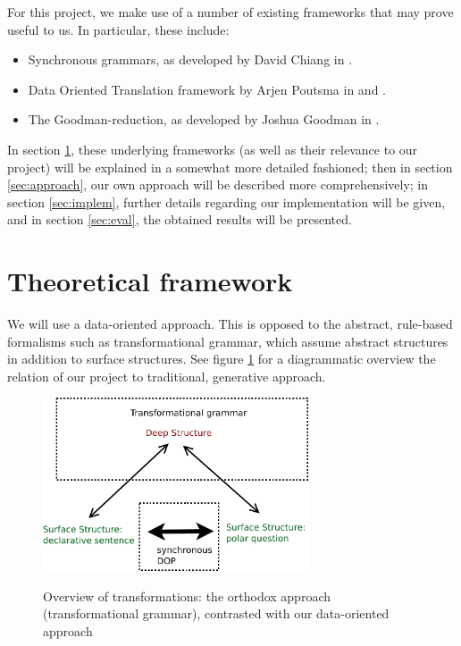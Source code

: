 \documentclass[a4paper]{article}
\theoremstyle{definition}
\begin{document}
For this project, we make use of a number of existing frameworks that may prove
useful to us. In particular, these include:

\begin{itemize}
\item Synchronous grammars, as developed by David Chiang in \cite{Ch}.
\item Data Oriented Translation framework by Arjen Poutsma in \cite{Po} and
	\cite{Po2}.
\item The Goodman-reduction, as developed by Joshua Goodman in \cite{Go}.
\end{itemize}

In section \ref{sec:theor}, these underlying frameworks (as well as their
relevance to our project) will be explained in a somewhat more detailed
fashioned; then in section \ref{sec:approach}, our own approach will be
described more comprehensively; in section \ref{sec:implem}, further details
regarding our implementation will be given, and in section \ref{sec:eval}, the
obtained results will be presented.

\section{Theoretical framework}
\label{sec:theor}

We will use a data-oriented approach. This is opposed to the abstract, rule-based
formalisms such as transformational grammar, which assume abstract structures in
addition to surface structures. See figure \ref{synchdop} for a diagrammatic overview
the relation of our project to traditional, generative approach.

\begin{figure}
\centering\includegraphics[width=0.7\textwidth]{synchdop-crop}
\label{synchdop}
\caption{Overview of transformations: the orthodox approach (transformational grammar),
	contrasted with our data-oriented approach}
\end{figure}
\end{document}
